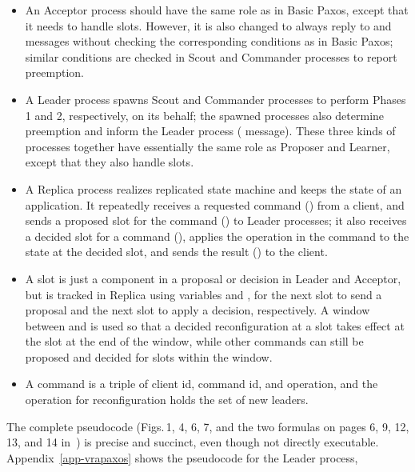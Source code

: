 \documentclass[11pt]{article}
\begin{document}
\begin{itemize}
  \arxiv{\setlength{\itemsep}{-.25ex}}

\item 
An Acceptor process should have the same role as in Basic Paxos,
except that it needs to handle slots.  However, it
is also changed to always reply to  and  messages without
checking the corresponding conditions as in Basic Paxos; similar conditions 
are checked in Scout and Commander processes to report preemption.


\item
A Leader process spawns Scout and Commander processes to perform Phases 1
and 2, respectively, on its behalf; the spawned processes also determine
preemption and inform the Leader process ( message).  These three
kinds of processes together have essentially the same role as Proposer and
Learner, except that they also handle slots.

\item
A Replica process %
realizes replicated state machine and keeps the state of an application.
It repeatedly receives a
requested command () from a client, and sends a proposed slot
for the command () to Leader processes; it also receives a
decided slot for a command
(), %
applies the operation in the command to the state at the decided slot, and
sends the result () to the client.

\item
A slot is just a component in a proposal or decision in Leader and
Acceptor, but is tracked in Replica using variables  and
, for the next slot to send a proposal and the next slot to
apply a decision, respectively.  
A window between  and  is used so that a decided
reconfiguration at a slot %
takes effect at the slot %
at the end of the window, while other commands can still be proposed and
decided for slots within the window.

\item
A command is a triple of client id, command id, and operation, and the
operation for reconfiguration holds the set of new leaders.

\end{itemize}
The complete pseudocode (Figs.\,1, 4, 6, 7, and the two formulas
on pages 6, 9, 12, 13, and 14 in~\cite{vra15paxos}) is precise and
succinct, even though not directly executable.  
Appendix~\ref{app-vrapaxos} shows the pseudocode for the Leader process,
\end{document}
